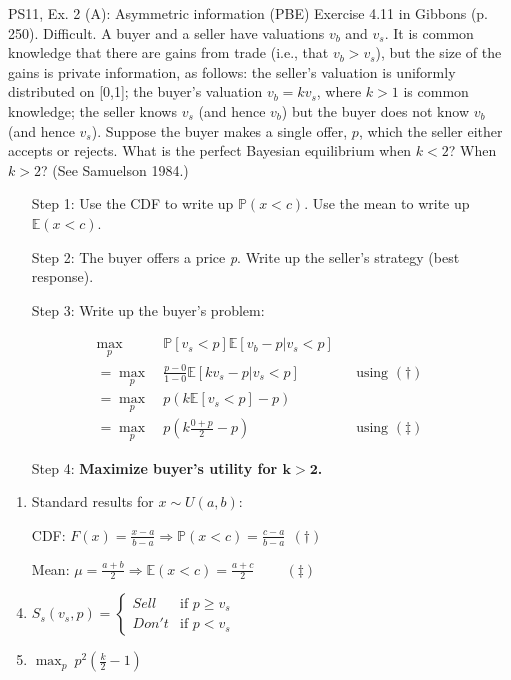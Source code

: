 \begin{frame}{PS11, Ex. 2 (A): Asymmetric information (PBE)}
    Exercise 4.11 in Gibbons (p. 250). Difficult. A buyer and a seller have valuations $v_b$ and $v_s$. It is common knowledge that there are gains from trade (i.e., that $v_b > v_s$), but the size of the gains is private information, as follows: the seller’s valuation is uniformly distributed on [0,1]; the buyer’s valuation $v_b = kv_s$, where $k > 1$ is common knowledge; the seller knows $v_s$ (and hence $v_b$) but the buyer does not know $v_b$ (and hence $v_s$). Suppose the buyer makes a single offer, $p$, which the seller either accepts or rejects. What is the perfect Bayesian equilibrium when $k < 2$? When $k > 2$? (See Samuelson 1984.) \vspace{-8pt}
    \begin{multicols}{2}
      \begin{itemize}
        \item[Step 1:] Use the CDF to write up $\mathbb{P}(x<c)$. Use the mean to write up $\mathbb{E}(x<c)$.
        \item[Step 2:] The buyer offers a price \textit{p}. Write up the seller's strategy (best response).
        \item[Step 3:] Write up the buyer's problem:
      \end{itemize} \vspace{-8pt}
      \begin{align*}
         \displaystyle{\max_p}&\ \mathbb{P}[v_s<p]\mathbb{E}[v_b-p|v_s<p]\\
        =\displaystyle{\max_p}&\ \frac{p-0}{1-0}\mathbb{E}[kv_s-p|v_s<p]&&\text{using }(\dagger)\\
        =\displaystyle{\max_p}&\ p\left(k\mathbb{E}[v_s<p]-p\right)\\
        =\displaystyle{\max_p}&\ p\left(k\frac{0+p}{2}-p\right)&&\text{using }(\ddagger)
      \end{align*} \vspace{-8pt}
      \begin{itemize}
        \item[Step 4:] \textbf{Maximize buyer's utility for $\bm{k>2}$.}
      \end{itemize}
      \vfill\null\columnbreak
      \begin{enumerate}
        \item Standard results for $x\sim U(a, b):$
        \item[CDF:] $F(x)=\frac{x-a}{b-a}\Rightarrow\mathbb{P}(x<c)=\frac{c-a}{b-a}\ \ (\dagger)$
        \item[Mean:] $\mu=\frac{a+b}{2}\Rightarrow\mathbb{E}(x<c)=\frac{a+c}{2}\quad\quad\ (\ddagger)$
        \item $S_s(v_s,p)=\left\{\begin{array}{ll}
          Sell  & \text{if }p\geq v_s \\
          Don't & \text{if }p < v_s
        \end{array}\right.$
        \item $\displaystyle{\max_p}\ p^2\left(\frac{k}{2}-1\right)$
      \end{enumerate}
      \vfill\null
    \end{multicols}
\end{frame}
